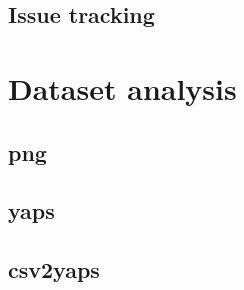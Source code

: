 \documentclass[12pt,twoside]{report}
\begin{document}
\subsection{Issue tracking}

\section{Dataset analysis}
\subsection{png}
\subsection{yaps}
\subsection{csv2yaps}



\appendix

\printbibliography
\end{document}
